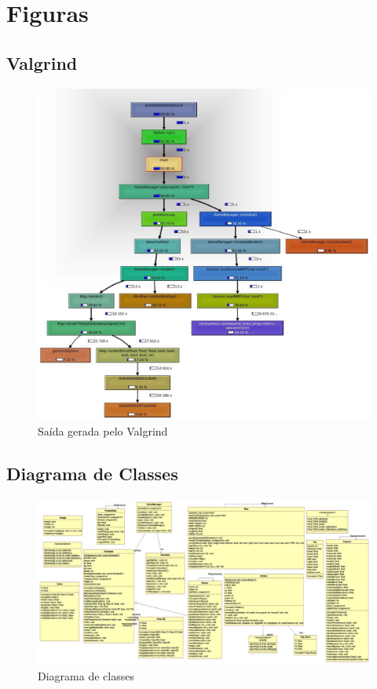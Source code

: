 \onecolumn

\section{Figuras}\label{figs}

\subsection{Valgrind}\label{val}

\begin{figure}[h]
	\centering
	\includegraphics [scale=0.5,angle=0,keepaspectratio=true]{./fts/callgrind/img3}
	\caption{Saída gerada pelo Valgrind}
	\label{valgrind}
\end{figure}

\newpage
\subsection{Diagrama de Classes}\label{class}
\begin{figure}[h]
	\centering
	\includegraphics [scale=0.92,angle=90,keepaspectratio=true]{./fts/diag_class}
	\caption{Diagrama de classes}
	\label{classes}
\end{figure}

